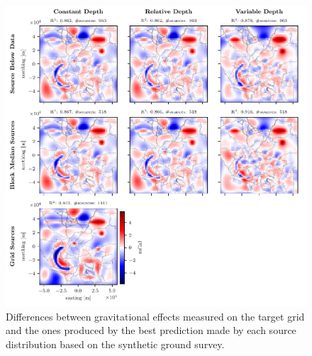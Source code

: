 \documentclass[twocolumn]{article}
\begin{document}
\begin{figure}
    \includegraphics[width=\linewidth]{figs/ground_survey_differences.pdf}
    \caption{
        Differences between gravitational effects measured on the target grid
        and the ones produced by the best prediction made by each source
        distribution based on the synthetic ground survey.
    }
    \label{fig:ground-survey-differences}
\end{figure}
\end{document}
